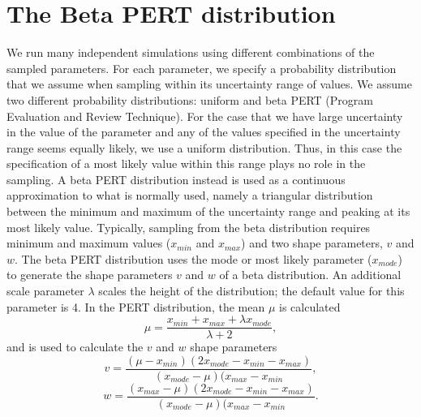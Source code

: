 \documentclass[11pt]{nih_mod}
\begin{document}
\newpage


\appendix

\section{The Beta PERT distribution}
\label{sec:PERT}

We run many independent simulations using different combinations of the sampled parameters. For each parameter, we specify a probability distribution that we assume when sampling within its uncertainty range of values. We assume two different probability distributions: uniform and beta PERT (Program Evaluation and Review Technique). For the case that we have large uncertainty in the value of the parameter and any of the values specified in the uncertainty range seems equally likely, we use a uniform distribution. Thus, in this case the specification of a most likely value within this range plays no role in the sampling. A beta PERT distribution instead is used as a continuous approximation to what is normally used, namely a triangular distribution between the minimum and maximum of the uncertainty range and peaking at its most likely value. Typically, sampling from the beta distribution requires minimum and maximum values ($x_{min}$ and $x_{max}$) and two shape parameters, $v$ and $w$. The beta PERT distribution uses the mode or most likely parameter ($x_{mode}$) to generate the shape parameters $v$ and $w$ of a beta distribution. An additional scale parameter $\lambda$ scales the height of the distribution; the default value for this parameter is 4. In the PERT distribution, the mean $\mu$ is calculated
\begin{equation}
	\mu = \frac{x_{min}+x_{max}+\lambda x_{mode}}{\lambda+2},
\end{equation}
and is used to calculate the $v$ and $w$ shape parameters
\begin{equation}
	v = \frac{(\mu-x_{min})(2x_{mode}-x_{min}-x_{max})} {(x_{mode}-\mu)(x_{max}-x_{min}},
\end{equation}
\begin{equation}
	w = \frac{(x_{max}-\mu)(2x_{mode}-x_{min}-x_{max})}{(x_{mode}-\mu)(x_{max}-x_{min}}.
\end{equation} 

\pagebreak


\end{document}
